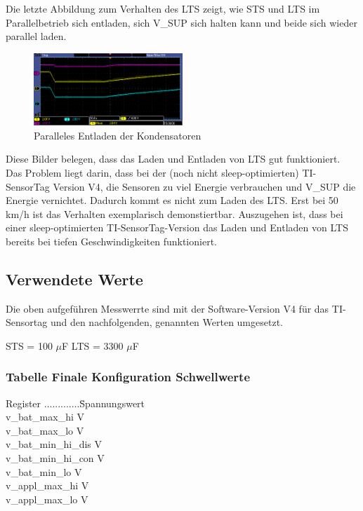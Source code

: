 Die letzte Abbildung zum Verhalten des LTS zeigt, wie STS und LTS im Parallelbetrieb sich entladen, sich V\_SUP sich halten kann und beide sich wieder parallel laden. 
\begin{figure}[ht]
   \includegraphics[width=0.5\textwidth]{4Resultate/imag/pic1.PNG}
    \caption{Paralleles Entladen der Kondensatoren}
    \label{parallel_entladen}
\end{figure}

Diese Bilder belegen, dass das Laden und Entladen von LTS gut funktioniert. Das Problem liegt darin, dass bei der (noch nicht sleep-optimierten) TI-SensorTag Version V4, die Sensoren zu viel Energie verbrauchen und V\_SUP die Energie vernichtet. Dadurch kommt es nicht zum Laden des LTS. Erst bei 50 km/h ist das Verhalten exemplarisch demonstiertbar. Auszugehen ist, dass bei einer sleep-optimierten TI-SensorTag-Version das Laden und Entladen von LTS bereits bei tiefen Geschwindigkeiten funktioniert.




\subsection{Verwendete Werte}
\label{werte}

Die oben aufgeführen Messwerrte sind mit der Software-Version V4 für das TI-Sensortag und den nachfolgenden, genannten Werten umgesetzt.

STS = 100 $\mu$F
LTS = 3300 $\mu$F


\subsubsection*{Tabelle Finale Konfiguration Schwellwerte }
\begin{tabbing}
    Register .............\quad\= Spannungswert \\[0.8ex]
    v\_bat\_max\_hi        V \\
    v\_bat\_max\_lo        V \\
    v\_bat\_min\_hi\_dis   V \\
    v\_bat\_min\_hi\_con   V \\
    v\_bat\_min\_lo        V \\
    v\_appl\_max\_hi       V \\
    v\_appl\_max\_lo       V \\   
\end{tabbing}  



